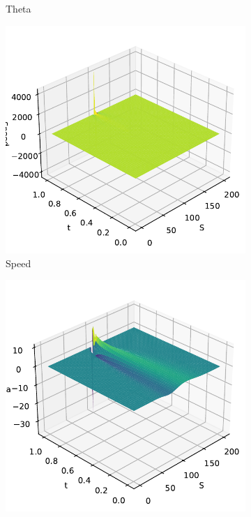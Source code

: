 \begin{figure}[H]
\begin{subfigure}[b]{0.3\linewidth}
        \caption{Theta}
    \end{subfigure}
    \begin{subfigure}[b]{0.3\linewidth}
        \includegraphics[width=\linewidth]{Imagenes/Parte1/6_Sols/Binary_Put/Binary_Put_Speed.pdf}
        \caption{Speed}
    \end{subfigure}
    \begin{subfigure}[b]{0.3\linewidth}
        \includegraphics[width=\linewidth]{Imagenes/Parte1/6_Sols/Binary_Put/Binary_Put_Vega.pdf}

\end{subfigure}
\end{figure}
